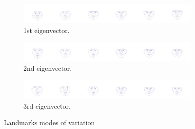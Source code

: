 \documentclass{article}
\begin{document}
\begin{figure}[H]
    \centering

    \begin{subfigure}[b]{0.8\textwidth}
        \centering
        \includegraphics[width=\linewidth]{images/mv_landmarks_eigenvector_0.jpg}
        \caption{1st eigenvector.}
        \label{fig:preprocessed_landmarks}
    \end{subfigure}


    \begin{subfigure}[b]{0.8\textwidth}
        \centering
        \includegraphics[width=\linewidth]{images/mv_landmarks_eigenvector_1.jpg}
        \caption{2nd eigenvector.}
        \label{fig:second_repetition}
    \end{subfigure}


    \begin{subfigure}[b]{0.8\textwidth}
        \centering
        \includegraphics[width=\linewidth]{images/mv_landmarks_eigenvector_2.jpg}
        \caption{3rd eigenvector.}
        \label{fig:third_repetition}
    \end{subfigure}

    \caption{Landmarks modes of variation}
    \label{fig:landmarks_modes_of_variation}
\end{figure}

\newpage


\end{document}
